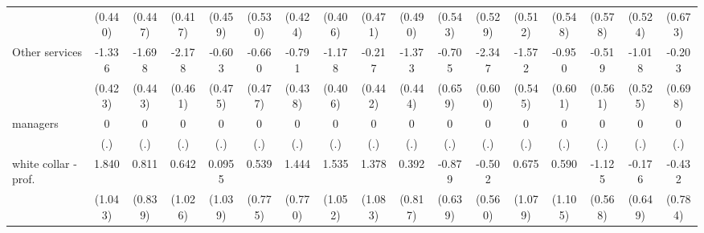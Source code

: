 {\begin{tabular}{l*{16}{c}}
                    &     (0.440)         &     (0.447)         &     (0.417)         &     (0.459)         &     (0.530)         &     (0.424)         &     (0.406)         &     (0.471)         &     (0.490)         &     (0.543)         &     (0.529)         &     (0.512)         &     (0.548)         &     (0.578)         &     (0.524)         &     (0.673)         \\
[1em]
Other services      &      -1.336\sym{**} &      -1.698\sym{***}&      -2.178\sym{***}&      -0.603         &      -0.660         &      -0.791         &      -1.178\sym{**} &      -0.217         &      -1.373\sym{**} &      -0.705         &      -2.347\sym{***}&      -1.572\sym{**} &      -0.950         &      -0.519         &      -1.018         &      -0.203         \\
                    &     (0.423)         &     (0.443)         &     (0.461)         &     (0.475)         &     (0.477)         &     (0.438)         &     (0.406)         &     (0.442)         &     (0.444)         &     (0.659)         &     (0.600)         &     (0.545)         &     (0.601)         &     (0.561)         &     (0.525)         &     (0.698)         \\
[1em]
managers            &           0         &           0         &           0         &           0         &           0         &           0         &           0         &           0         &           0         &           0         &           0         &           0         &           0         &           0         &           0         &           0         \\
                    &         (.)         &         (.)         &         (.)         &         (.)         &         (.)         &         (.)         &         (.)         &         (.)         &         (.)         &         (.)         &         (.)         &         (.)         &         (.)         &         (.)         &         (.)         &         (.)         \\
[1em]
white collar - prof.&       1.840         &       0.811         &       0.642         &      0.0955         &       0.539         &       1.444         &       1.535         &       1.378         &       0.392         &      -0.879         &      -0.502         &       0.675         &       0.590         &      -1.125\sym{*}  &      -0.176         &      -0.432         \\
                    &     (1.043)         &     (0.839)         &     (1.026)         &     (1.039)         &     (0.775)         &     (0.770)         &     (1.052)         &     (1.083)         &     (0.817)         &     (0.639)         &     (0.560)         &     (1.079)         &     (1.105)         &     (0.568)         &     (0.649)         &     (0.784)         \\

\end{tabular}}

